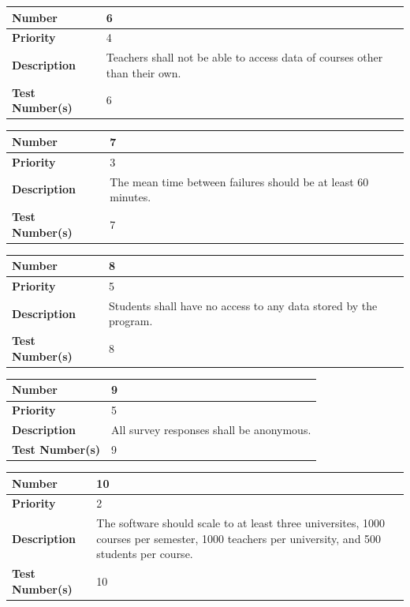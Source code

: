\documentclass{article}
\begin{document}
\begin{center}
\bigskip
{}
\begin{tabular}{|p{3.5cm}|p{7.5cm}|} 
\hline
\textbf{Number} & 6  \\
\hline
\textbf{Priority} & 4\\ 
\hline
\textbf{Description} & Teachers shall not be able to access data of courses other than their own. \\ 
\hline
\textbf{Test Number(s) }& 6 \\ 
\hline
\end{tabular}


\bigskip
\vspace{1in}
\begin{tabular}{|p{3.5cm}|p{7.5cm}|} 
\hline
\textbf{Number} & 7  \\
\hline
\textbf{Priority} & 3\\ 
\hline
\textbf{Description} & The mean time between failures should be at least 60 minutes. \\ 
\hline
\textbf{Test Number(s) }& 7 \\ 
\hline
\end{tabular}


\bigskip
{}
\begin{tabular}{|p{3.5cm}|p{7.5cm}|} 
\hline
\textbf{Number} & 8  \\
\hline
\textbf{Priority} & 5\\ 
\hline
\textbf{Description} & Students shall have no access to any data stored by the program. \\ 
\hline
\textbf{Test Number(s) }& 8 \\ 
\hline
\end{tabular}


\bigskip
{}
\begin{tabular}{|p{3.5cm}|p{7.5cm}|} 
\hline
\textbf{Number} & 9  \\
\hline
\textbf{Priority} & 5 \\ 
\hline
\textbf{Description} & All survey responses shall be anonymous. \\ 
\hline
\textbf{Test Number(s) }& 9 \\ 
\hline
\end{tabular}


\bigskip
{}
\begin{tabular}{|p{3.5cm}|p{7.5cm}|} 
\hline
\textbf{Number} & 10  \\
\hline
\textbf{Priority} & 2\\ 
\hline
\textbf{Description} & The software should scale to at least three universites, 1000 courses per semester, 1000 teachers per university, and 500 students per course. \\ 
\hline
\textbf{Test Number(s) }& 10 \\ 
\hline
\end{tabular}



\end{center}
\end{document}
